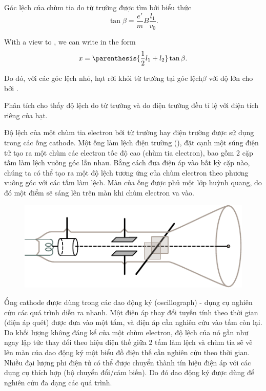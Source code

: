 Góc lệch của chùm tia do từ trường được tìm bởi biểu thức
\begin{equation}\label{eq:10_9}
    \tan\beta = \frac{e'}{m} B \frac{l_1}{v_0}.
\end{equation}

\noindent
With a view to , we can write  in the form
\begin{equation*}
    x = \parenthesis{\frac{1}{2} l_1 + l_2} \tan\beta.
\end{equation*}

\noindent
Do đó, với các góc lệch nhỏ, hạt rời khỏi từ trường tại góc lệch$\beta$ với độ lớn cho bởi .

Phân tích  cho thấy độ lệch do từ trường và do điện trường đều tỉ lệ với điện tích riêng của hạt.

Độ lệch của một chùm tia electron bởi từ trường hay điện trường được sử dụng trong các ống cathode.
Một ống làm lệch điện trường (), đặt cạnh một súng điện tử tạo ra một chùm các electron tốc độ cao (chùm tia electron), bao gồm 2 cặp tấm làm lệch vuông góc lẫn nhau.
Bằng cách đưa điện áp vào bất kỳ cặp nào, chúng ta có thể tạo ra một độ lệch tương ứng của chùm electron theo phương vuông góc với các tấm làm lệch.
Màn của ống được phủ một lớp huỳnh quang, do đó một điểm sẽ sáng lên trên màn khi chùm electron va vào.

\begin{figure}[t]
	\begin{center}
		\includegraphics[scale=1]{figures/ch_10/fig_10_5.pdf}
		\caption[]{}
		\label{fig:10_5}
	\end{center}
	\vspace{-0.8cm}
\end{figure}

Ống cathode được dùng trong các dao động ký (oscillograph) - dụng cụ nghiên cứu các quá trình diễn ra nhanh.
Một điện áp thay đổi tuyến tính theo thời gian (điện áp quét) được đưa vào một tấm, và điện áp cần nghiên cứu vào tấm còn lại.
Do khối lượng không đáng kể của một chùm electron, độ lệch của nó gần như ngay lập tức thay đổi theo hiệu điện thế giữa 2 tấm làm lệch và chùm tia sẽ vẽ lên màn của dao động ký một biểu đồ điện thế cần nghiên cứu theo thời gian.
Nhiều đại lượng phi điện tử có thể được chuyển thành tín hiệu điện áp với các dụng cụ thích hợp (bộ chuyển đổi/cảm biến).
Do đó dao động ký được dùng để nghiên cứu đa dạng các quá trình.

